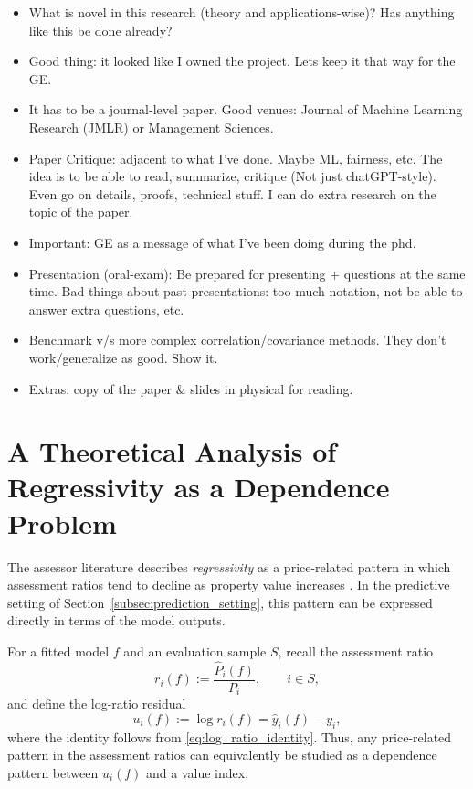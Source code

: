 \documentclass[12pt, draft]{article}
\theoremstyle{plain}
\theoremstyle{definition}
\newcommand{\1}{\mathbf{1}}
\begin{document}
\begin{itemize}
    \item What is novel in this research (theory and applications-wise)? Has anything like this be done already?
    \item Good thing: it looked like I owned the project. Lets keep it that way for the GE.
    \item It has to be a journal-level paper. Good venues: Journal of Machine Learning Research (JMLR) or Management Sciences.
    \item Paper Critique: adjacent to what I've done. Maybe ML, fairness, etc. The idea is to be able to read, summarize, critique (Not just chatGPT-style). Even go on details, proofs, technical stuff. I can do extra research on the topic of the paper.
    \item Important: GE as a message of what I've been doing during the phd.
    \item Presentation (oral-exam): Be prepared for presenting + questions at the same time. Bad things about past presentations: too much notation, not be able to answer extra questions, etc.
    \item Benchmark v/s more complex correlation/covariance methods. They don't work/generalize as good. Show it.
    \item Extras: copy of the paper \& slides in physical for reading.
\end{itemize}

\printbibliography %

\newpage

\appendix

\section{A Theoretical Analysis of Regressivity as a Dependence Problem}
\label{anex:regressivity_dependence}

The assessor literature describes \emph{regressivity} as a price-related pattern in which assessment ratios tend to decline as property value increases \cite{IAAO2013Ratio,IAAO2025ExposureRatio}. In the predictive setting of Section~\ref{subsec:prediction_setting}, this pattern can be expressed directly in terms of the model outputs.

For a fitted model $f$ and an evaluation sample $S$, recall the assessment ratio
\[
r_i(f):=\frac{\widehat P_i(f)}{P_i},
\qquad i\in S,
\]
and define the log-ratio residual
\[
u_i(f):=\log r_i(f)=\hat y_i(f)-y_i,
\]
where the identity follows from \eqref{eq:log_ratio_identity}. Thus, any price-related pattern in the assessment ratios can equivalently be studied as a dependence pattern between $u_i(f)$ and a value index.
\end{document}
